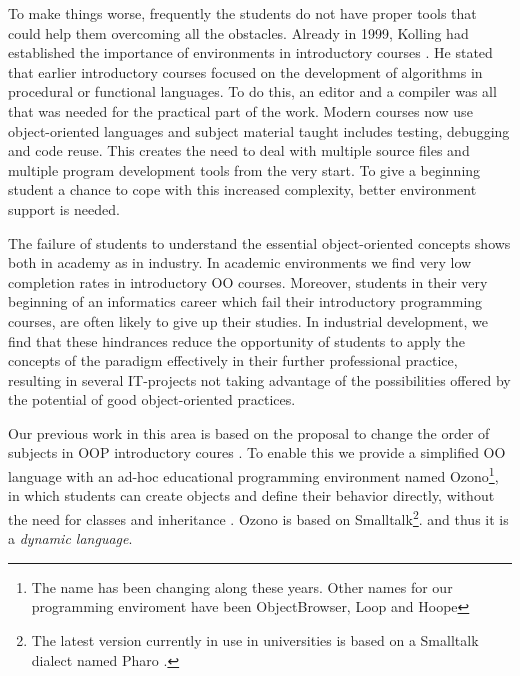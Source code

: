 To make things worse, frequently the students do not have proper tools that could help them overcoming all the obstacles.
Already in 1999, Kolling \etal had established the importance of environments in introductory courses \cite{kolling_problem_1999}. 
He stated that earlier introductory courses focused on the development of algorithms in procedural or functional languages. 
To do this, an editor and a compiler was all that was needed for the practical part of the work. 
Modern courses now use object-oriented languages and subject material taught includes testing, debugging and code reuse. 
This creates the need to deal with multiple source files and multiple program development tools from the very start. 
To give a beginning student a chance to cope with this increased complexity, better environment support is needed. 

\medskip


The failure of students to understand the essential object-oriented concepts shows both in academy as in industry.
In academic environments we find very low completion rates in introductory OO courses.
Moreover, students in their very beginning of an informatics career which fail their introductory programming courses, are often likely to give up their studies\cite{milne_2002}.
In industrial development, we find that these hindrances reduce the opportunity of students to apply
the concepts of the paradigm effectively in their further
professional practice, resulting in several IT-projects not taking
advantage of the possibilities offered by the potential of good
object-oriented practices. \cite{lombardi_instances_2007}

\medskip 


Our previous work in this area is based on the proposal to change the order of subjects in OOP introductory coures \cite{lombardi_instances_2007}.
To enable this we provide a simplified OO language with an ad-hoc educational programming environment 
named Ozono\footnote{The name has been changing along these years. Other names for our programming enviroment have been ObjectBrowser, Loop and Hoope}, 
in which students can create objects and define their behavior directly, without the need for classes and inheritance \cite{griggio_programming_2011}.
Ozono is based on Smalltalk\footnote{The latest version currently in use in universities is based on a Smalltalk dialect named Pharo \cite{black_pharo_2010}.}.
and thus it is a \textit{dynamic language}.

